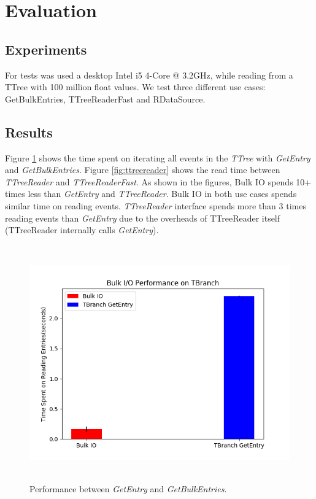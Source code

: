 \section{Evaluation}
\label{sec:evaluation}

\subsection{Experiments}

For tests was used a desktop Intel i5 4-Core @ 3.2GHz, while reading from a TTree with 100 million float values. We test three different use cases: GetBulkEntries, TTreeReaderFast and RDataSource.

\subsection{Results}

Figure \ref{fig:tbranch} shows the time spent on iterating all events in the \textit{TTree} with \textit{GetEntry} and \textit{GetBulkEntries}. Figure \ref{fig:ttreereader} shows the read time between \textit{TTreeReader} and \textit{TTreeReaderFast}. As shown in the figures, Bulk IO spends 10+ times less than \textit{GetEntry} and \textit{TTreeReader}. Bulk IO in both use cases spends similar time on reading events. \textit{TTreeReader} interface spends more than 3 times reading events than \textit{GetEntry} due to the overheads of TTreeReader itself (TTreeReader internally calls \textit{GetEntry}). 

\begin{figure}[!ht]
\centering
\includegraphics[height=4in, width=5in]{getbulkentries.png}
\vspace*{-2mm}
\caption{Performance between \textit{GetEntry} and \textit{GetBulkEntries}.}
\label{fig:tbranch}
\end{figure}

